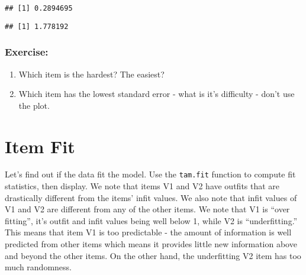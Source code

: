 \documentclass[
]{book}
\newenvironment{Shaded}{\begin{snugshade}}{\end{snugshade}}
\newcommand{\FunctionTok}[1]{\textcolor[rgb]{0.00,0.00,0.00}{#1}}
\newcommand{\NormalTok}[1]{#1}
\newcommand{\SpecialCharTok}[1]{\textcolor[rgb]{0.00,0.00,0.00}{#1}}
\providecommand{\tightlist}{%
  \setlength{\itemsep}{0pt}\setlength{\parskip}{0pt}}
\begin{document}
\begin{Shaded}
\end{Shaded}

\begin{verbatim}
## [1] 0.2894695
\end{verbatim}

\begin{Shaded}
\end{Shaded}

\begin{verbatim}
## [1] 1.778192
\end{verbatim}

\hypertarget{exercise}{%
\subsection{Exercise:}\label{exercise}}

\begin{enumerate}
\def\labelenumi{\arabic{enumi}.}
\tightlist
\item
  Which item is the hardest? The easiest?
\item
  Which item has the lowest standard error - what is it's difficulty - don't use the plot.
\end{enumerate}

\hypertarget{item-fit}{%
\chapter{Item Fit}\label{item-fit}}

Let's find out if the data fit the model. Use the \texttt{tam.fit} function to compute fit statistics, then display. We note that items V1 and V2 have outfits that are drastically different from the items' infit values. We also note that infit values of V1 and V2 are different from any of the other items. We note that V1 is ``over fitting'', it's outfit and infit values being well below 1, while V2 is ``underfitting.'' This means that item V1 is too predictable - the amount of information is well predicted from other items which means it provides little new information above and beyond the other items. On the other hand, the underfitting V2 item has too much randomness.
\end{document}
